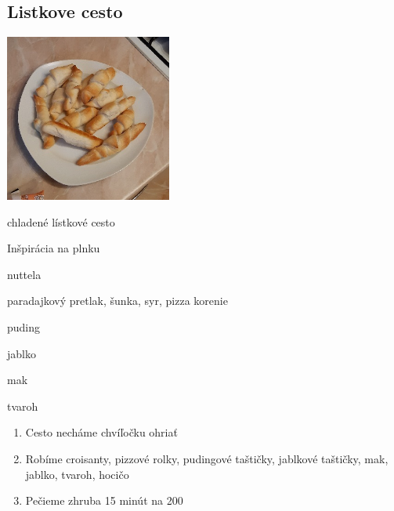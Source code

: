 \setcounter{step}{0}
\subsection{Listkove cesto}

\begin{ingredient}
\includegraphics[height=5.5cm]{images/listkove_cesto}
\def\portions{4}%

\begin{main}
	\item chladené lístkové cesto
\end{main}
\begin{subingredient}{Inšpirácia na plnku}
	\item nuttela
	\item paradajkový pretlak, šunka, syr, pizza korenie
	\item puding
	\item jablko
	\item mak
	\item tvaroh
\end{subingredient}
\end{ingredient}
\begin{recipe}

\begin{enumerate}
\item{Cesto necháme chvíľočku ohriať}
\item{Robíme croisanty, pizzové rolky, pudingové taštičky, jablkové taštičky, mak, jablko, tvaroh, hocičo}
\item{Pečieme zhruba 15 minút na 200}
\end{enumerate}
\end{recipe}

\begin{notes}

\end{notes}
\clearpage	